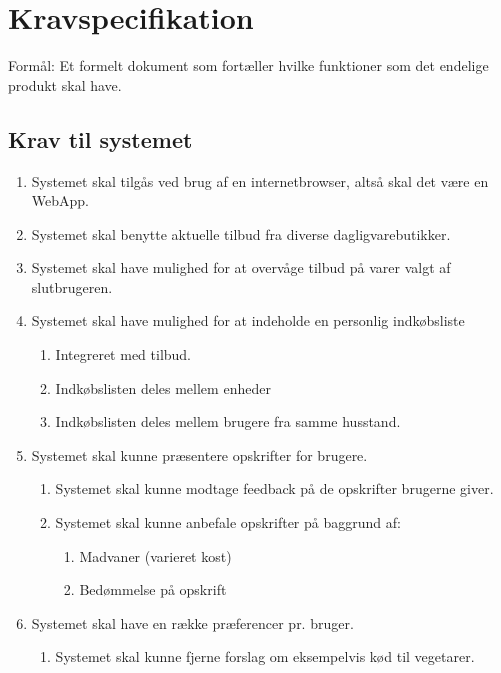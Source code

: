 \chapter{Kravspecifikation}
Formål: Et formelt dokument som fortæller hvilke funktioner som det endelige produkt skal have. 

\section{Krav til systemet}
\begin{enumerate}
	\item Systemet skal tilgås ved brug af en internetbrowser, altså skal det være en WebApp.
	\item Systemet skal benytte aktuelle tilbud fra diverse dagligvarebutikker.
	\item Systemet skal have mulighed for at overvåge tilbud på varer valgt af slutbrugeren.
	\item Systemet skal have mulighed for at indeholde en personlig indkøbsliste
	\begin{enumerate}
		\item Integreret med tilbud.
		\item Indkøbslisten deles mellem enheder
		\item Indkøbslisten deles mellem brugere fra samme husstand. 
	\end{enumerate}
	\item Systemet skal kunne præsentere opskrifter for brugere.
	\begin{enumerate}
		\item Systemet skal kunne modtage feedback på de opskrifter brugerne giver.
		\item Systemet skal kunne anbefale opskrifter på baggrund af:
		\begin{enumerate}
			\item Madvaner (varieret kost)
			\item Bedømmelse på opskrift
		\end{enumerate}
	\end{enumerate}
	\item Systemet skal have en række præferencer pr. bruger.
	\begin{enumerate}
		\item Systemet skal kunne fjerne forslag om eksempelvis kød til vegetarer.
	\end{enumerate}
\end{enumerate}
